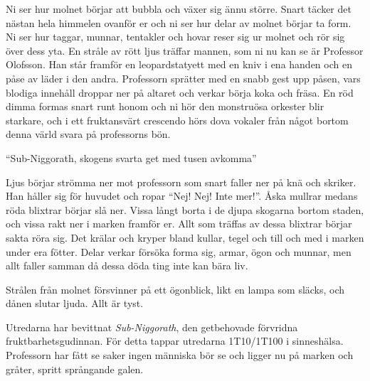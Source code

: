 \begin{displayquote}
	Ni ser hur molnet börjar att bubbla och växer sig ännu större. Snart täcker det nästan hela himmelen ovanför er och ni ser hur delar av molnet börjar ta form. Ni ser hur taggar, munnar, tentakler och hovar reser sig ur 
	molnet och rör sig över dess yta. En stråle av rött ljus träffar mannen, som ni nu kan se är Professor Olofsson. Han står framför en leopardstatyett med en kniv i ena handen och en påse av läder i den andra. 
	Professorn sprätter med en snabb gest upp påsen, vars blodiga innehåll droppar ner på altaret och verkar börja koka och fräsa. En röd dimma formas snart runt honom och ni hör den monstruösa orkester blir starkare, 
	och i ett fruktansvärt crescendo hörs dova vokaler från något bortom denna värld svara på professorns bön.
	\begin{center}
		``Sub-Niggorath, skogens svarta get med tusen avkomma''
	\end{center}
	Ljus börjar strömma ner mot professorn som snart faller ner på knä och skriker. Han håller sig för huvudet och ropar ``Nej! Nej! Inte mer!''. Åska mullrar medans röda blixtrar börjar slå ner. Vissa långt borta i de djupa skogarna bortom staden, och vissa rakt 
	ner i marken framför er. Allt som träffas av dessa blixtrar börjar sakta röra sig. Det krälar och kryper bland kullar, tegel och till och med i marken under era fötter. Delar verkar försöka forma sig, armar, ögon och munnar, 
	men allt faller samman då dessa döda ting inte kan bära liv.

	Strålen från molnet försvinner på ett ögonblick, likt en lampa som släcks, och dånen slutar ljuda. Allt är tyst.
\end{displayquote}
%
Utredarna har bevittnat \textit{Sub-Niggorath}, den getbehovade förvridna fruktbarhetsgudinnan. För detta tappar utredarna 1T10/1T100 i sinneshälsa. Professorn har fått se saker ingen människa bör se och ligger nu på marken och 
gråter, spritt språngande galen.
